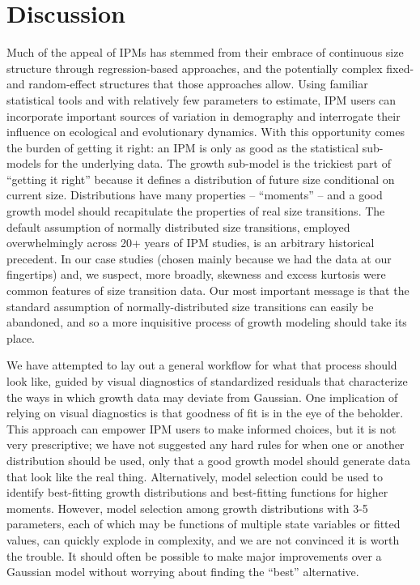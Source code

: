 \documentclass[12pt]{article}
\begin{document}
\section{Discussion}
\label{sec:Discussion} 
Much of the appeal of IPMs has stemmed from their embrace of continuous size structure through regression-based approaches, and the potentially complex fixed- and random-effect structures that those approaches allow. 
Using familiar statistical tools and with relatively few parameters to estimate, IPM users can incorporate important sources of variation in demography and interrogate their influence on ecological and evolutionary dynamics. 
With this opportunity comes the burden of getting it right: an IPM is only as good as the statistical sub-models for the underlying data. 
The growth sub-model is the trickiest part of ``getting it right'' because it defines a distribution of future size conditional on current size. 
Distributions have many properties -- ``moments'' -- and a good growth model should recapitulate the properties of real size transitions. 
The default assumption of normally distributed size transitions, employed overwhelmingly across 20+ years of IPM studies, is an arbitrary historical precedent. 
In our case studies (chosen mainly because we had the data at our fingertips) and, we suspect, more broadly, skewness and excess kurtosis were common features of size transition data. 
Our most important message is that the standard assumption of normally-distributed size transitions can easily be abandoned, and so a more inquisitive process of growth modeling should take its place. 

We have attempted to lay out a general workflow for what that process should look like, guided by visual diagnostics of standardized residuals that characterize the ways in which growth data may deviate from Gaussian. 
One implication of relying on visual diagnostics is that goodness of fit is in the eye of the beholder. 
This approach can empower IPM users to make informed choices, but it is not very prescriptive; we have not suggested any hard rules for when one or another distribution should be used, only that a good growth model should generate data that look like the real thing. 
Alternatively, model selection could be used to identify best-fitting growth distributions and best-fitting functions for higher moments. 
However, model selection among growth distributions with 3-5 parameters, each of which may be functions of multiple state variables or fitted values, can quickly explode in complexity, and we are not convinced it is worth the trouble. 
It should often be possible to make major improvements over a Gaussian model without worrying about finding the ``best'' alternative. 
\end{document}

